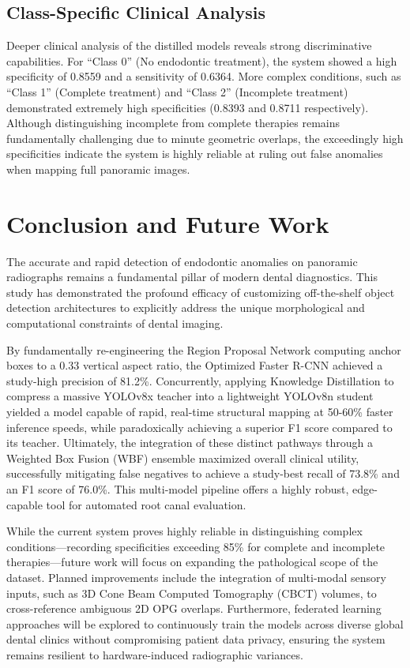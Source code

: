 \documentclass[conference]{IEEEtran}
\begin{document}
\subsection{Class-Specific Clinical Analysis}
Deeper clinical analysis of the distilled models reveals strong discriminative capabilities. For ``Class 0'' (No endodontic treatment), the system showed a high specificity of 0.8559 and a sensitivity of 0.6364. More complex conditions, such as ``Class 1'' (Complete treatment) and ``Class 2'' (Incomplete treatment) demonstrated extremely high specificities (0.8393 and 0.8711 respectively). Although distinguishing incomplete from complete therapies remains fundamentally challenging due to minute geometric overlaps, the exceedingly high specificities indicate the system is highly reliable at ruling out false anomalies when mapping full panoramic images.

\section{Conclusion and Future Work}

The accurate and rapid detection of endodontic anomalies on panoramic radiographs remains a fundamental pillar of modern dental diagnostics. This study has demonstrated the profound efficacy of customizing off-the-shelf object detection architectures to explicitly address the unique morphological and computational constraints of dental imaging. 

By fundamentally re-engineering the Region Proposal Network computing anchor boxes to a 0.33 vertical aspect ratio, the Optimized Faster R-CNN achieved a study-high precision of 81.2\%. Concurrently, applying Knowledge Distillation to compress a massive YOLOv8x teacher into a lightweight YOLOv8n student yielded a model capable of rapid, real-time structural mapping at 50-60\% faster inference speeds, while paradoxically achieving a superior F1 score compared to its teacher. Ultimately, the integration of these distinct pathways through a Weighted Box Fusion (WBF) ensemble maximized overall clinical utility, successfully mitigating false negatives to achieve a study-best recall of 73.8\% and an F1 score of 76.0\%. This multi-model pipeline offers a highly robust, edge-capable tool for automated root canal evaluation.

While the current system proves highly reliable in distinguishing complex conditions---recording specificities exceeding 85\% for complete and incomplete therapies---future work will focus on expanding the pathological scope of the dataset. Planned improvements include the integration of multi-modal sensory inputs, such as 3D Cone Beam Computed Tomography (CBCT) volumes, to cross-reference ambiguous 2D OPG overlaps. Furthermore, federated learning approaches will be explored to continuously train the models across diverse global dental clinics without compromising patient data privacy, ensuring the system remains resilient to hardware-induced radiographic variances.
\end{document}
